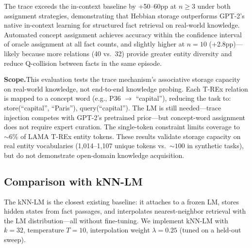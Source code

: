 \documentclass[11pt,a4paper]{article}
\begin{document}
The trace exceeds the in-context baseline by +50--60pp at $n{\geq}3$ under both assignment strategies, demonstrating that Hebbian storage outperforms GPT-2's native in-context learning for structured fact retrieval on real-world knowledge. Automated concept assignment achieves accuracy within the confidence interval of oracle assignment at all fact counts, and slightly higher at $n{=}10$ (+2.8pp)---likely because more relations (40 vs.\ 32) provide greater entity diversity and reduce Q-collision between facts in the same episode.

\textbf{Scope.}\quad This evaluation tests the trace mechanism's associative storage capacity on real-world knowledge, not end-to-end knowledge probing. Each T-REx relation is mapped to a concept word (e.g., P36 $\to$ ``capital''), reducing the task to: store(``capital'', ``Paris''), query(``capital''). The LM is still needed---trace injection competes with GPT-2's pretrained prior---but concept-word assignment does not require expert curation. The single-token constraint limits coverage to ${\sim}6\%$ of LAMA T-REx entity tokens. These results validate storage capacity on real entity vocabularies (1,014--1,107 unique tokens vs.\ ${\sim}100$ in synthetic tasks), but do not demonstrate open-domain knowledge acquisition.

\subsection{Comparison with kNN-LM}
\label{sec:knn_comparison}

The kNN-LM \citep{khandelwal2020generalization} is the closest existing baseline: it attaches to a frozen LM, stores hidden states from fact passages, and interpolates nearest-neighbor retrieval with the LM distribution---all without fine-tuning. We implement kNN-LM with $k{=}32$, temperature $T{=}10$, interpolation weight $\lambda{=}0.25$ (tuned on a held-out sweep).
\end{document}
